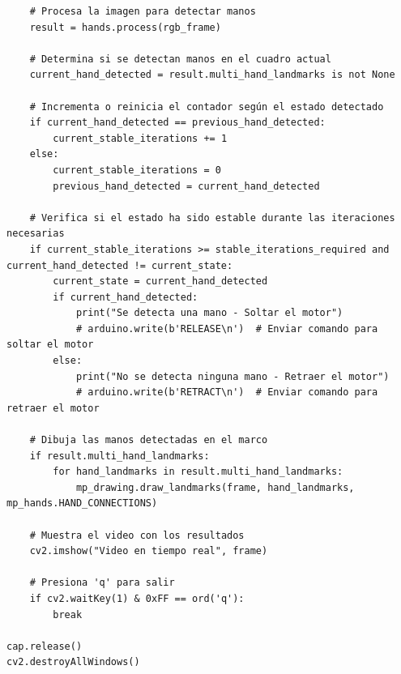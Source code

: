 \begin{verbatim}
    # Procesa la imagen para detectar manos
    result = hands.process(rgb_frame)

    # Determina si se detectan manos en el cuadro actual
    current_hand_detected = result.multi_hand_landmarks is not None

    # Incrementa o reinicia el contador según el estado detectado
    if current_hand_detected == previous_hand_detected:
        current_stable_iterations += 1
    else:
        current_stable_iterations = 0
        previous_hand_detected = current_hand_detected

    # Verifica si el estado ha sido estable durante las iteraciones necesarias
    if current_stable_iterations >= stable_iterations_required and current_hand_detected != current_state:
        current_state = current_hand_detected
        if current_hand_detected:
            print("Se detecta una mano - Soltar el motor")
            # arduino.write(b'RELEASE\n')  # Enviar comando para soltar el motor
        else:
            print("No se detecta ninguna mano - Retraer el motor")
            # arduino.write(b'RETRACT\n')  # Enviar comando para retraer el motor

    # Dibuja las manos detectadas en el marco
    if result.multi_hand_landmarks:
        for hand_landmarks in result.multi_hand_landmarks:
            mp_drawing.draw_landmarks(frame, hand_landmarks, mp_hands.HAND_CONNECTIONS)

    # Muestra el video con los resultados
    cv2.imshow("Video en tiempo real", frame)

    # Presiona 'q' para salir
    if cv2.waitKey(1) & 0xFF == ord('q'):
        break

cap.release()
cv2.destroyAllWindows()
\end{verbatim}

